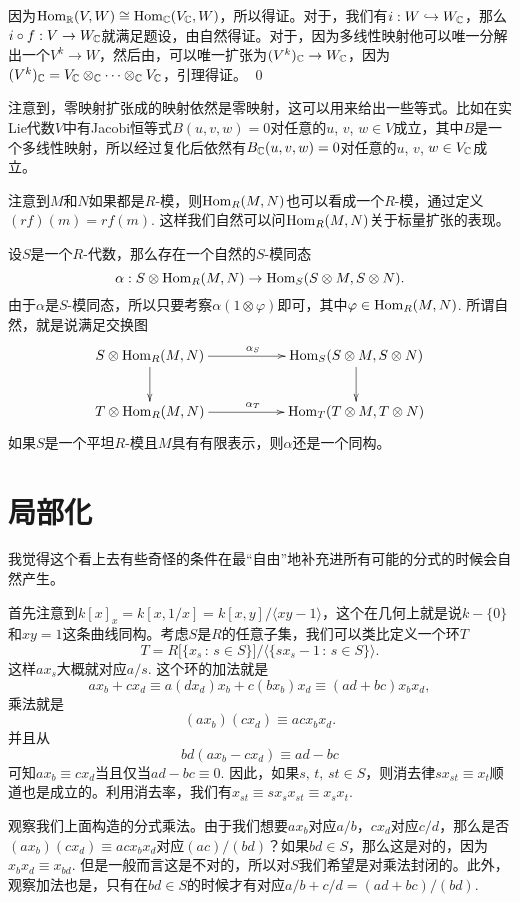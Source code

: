 \proof 
	因为$\operatorname{Hom}_{\mathbb{R}}(V,W)\cong \operatorname{Hom}_{\mathbb{C}}(V_{\mathbb{C}},W)$，所以得证。对于，我们有$i:W\hookrightarrow W_{\mathbb{C}}$，那么$i\circ f:V\to W_{\mathbb{C}}$就满足题设，由自然得证。对于，因为多线性映射他可以唯一分解出一个$V^k\to W$，然后由，可以唯一扩张为$(V^k)_{\mathbb{C}}\to W_{\mathbb{C}}$，因为$(V^k)_{\mathbb{C}}=V_{\mathbb{C}}\otimes_{\mathbb{C}} \cdots\otimes_{\mathbb{C}} V_{\mathbb{C}}$，引理得证。
\qed

注意到，零映射扩张成的映射依然是零映射，这可以用来给出一些等式。比如在实Lie代数$V$中有Jacobi恒等式$B(u,v,w)=0$对任意的$u$, $v$, $w\in V$成立，其中$B$是一个多线性映射，所以经过复化后依然有$B_{\mathbb{C}} (u,v,w)=0$对任意的$u$, $v$, $w\in V_{\mathbb{C}}$成立。

\para 注意到$M$和$N$如果都是$R$-模，则$\operatorname{Hom}_R(M,N)$也可以看成一个$R$-模，通过定义$(rf)(m)=rf(m)$. 这样我们自然可以问$\operatorname{Hom}_R(M,N)$关于标量扩张的表现。

设$S$是一个$R$-代数，那么存在一个自然的$S$-模同态
\[
	\alpha:S\otimes\operatorname{Hom}_R(M,N)\to \operatorname{Hom}_S(S\otimes M,S\otimes N).
\]
由于$\alpha$是$S$-模同态，所以只要考察$\alpha(1\otimes \varphi)$即可，其中$\varphi\in \operatorname{Hom}_R(M,N)$. 所谓自然，就是说满足交换图
\[
\begin{xy}
	\xymatrix
	{
		S\otimes\Hom_R(M,N)\ar[rr]^{\alpha_S}\ar[d]&&\Hom_S(S\otimes M,S\otimes N)\ar[d]\\
		T\otimes\Hom_R(M,N)\ar[rr]^{\alpha_T}&&\Hom_T(T\otimes M,T\otimes N)
	}
\end{xy}
\]
如果$S$是一个平坦$R$-模且$M$具有有限表示，则$\alpha$还是一个同构。

\section{局部化}

我觉得这个看上去有些奇怪的条件在最“自由”地补充进所有可能的分式的时候会自然产生。

首先注意到$k[x]_x=k[x,1/x]=k[x,y]/\langle xy-1\rangle$，这个在几何上就是说$k-\{0\}$和$xy=1$这条曲线同构。考虑$S$是$R$的任意子集，我们可以类比定义一个环$T$
\[
T=R\bigl[\{x_s\,:\, s\in S\}\bigr]/\bigl\langle\{sx_s-1\,:\, s\in S\}\bigr\rangle.
\]
这样$ax_s$大概就对应$a/s$. 这个环的加法就是
\[
ax_{b}+cx_d\equiv a(dx_d)x_{b}+c(bx_{b})x_d\equiv (ad+bc)x_bx_d,
\]
乘法就是
\[
(ax_{b})(cx_d)\equiv acx_bx_d.
\]
并且从
\[
bd(ax_{b}-cx_d)\equiv ad-bc
\]
可知$ax_{b}\equiv cx_d$当且仅当$ad-bc\equiv 0$. 因此，如果$s,\,t,\,st\in S$，则消去律$sx_{st}\equiv x_t$顺道也是成立的。利用消去率，我们有$x_{st}\equiv sx_s x_{st}\equiv  x_s x_t$.

观察我们上面构造的分式乘法。由于我们想要$ax_b$对应$a/b$，$cx_d$对应$c/d$，那么是否$(ax_{b})(cx_d)\equiv acx_bx_d$对应$(ac)/(bd)$？如果$bd\in S$，那么这是对的，因为$x_bx_d\equiv x_{bd}$. 但是一般而言这是不对的，所以对$S$我们希望是对乘法封闭的。此外，观察加法也是，只有在$bd\in S$的时候才有对应$a/b+c/d=(ad+bc)/(bd)$.

